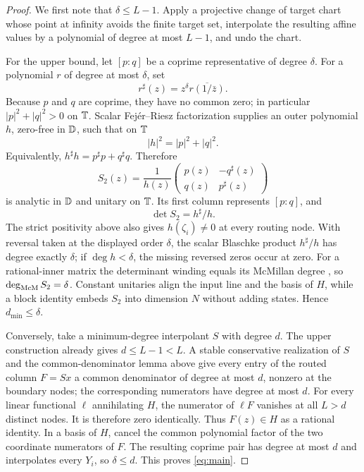 \documentclass[11pt]{article}
\theoremstyle{definition}\newtheorem{definition}[theorem]{Definition}\newtheorem{example}[theorem]{Example}
\theoremstyle{remark}\newtheorem{remark}[theorem]{Remark}\newtheorem{limitation}[theorem]{Limitation}
\begin{document}
\begin{proof}
We first note that $\delta\le L-1$.  Apply a projective change of target chart
whose point at infinity avoids the finite target set, interpolate the resulting
affine values by a polynomial of degree at most $L-1$, and undo the chart.

For the upper bound, let $[p:q]$ be a coprime representative of degree
$\delta$.  For a polynomial $r$ of degree at most $\delta$, set
\[
                   r^\sharp(z)=z^\delta\overline{r(1/\bar z)}.
\]
Because $p$ and $q$ are coprime, they have no common zero; in particular
$|p|^2+|q|^2>0$ on $\mathbb T$.  Scalar Fej\'er--Riesz factorization
\cite{DritschelRovnyak2010} supplies an outer polynomial $h$, zero-free
in $\mathbb D$, such that on $\mathbb T$
\[
                       |h|^2=|p|^2+|q|^2.
\]
Equivalently, $h^\sharp h=p^\sharp p+q^\sharp q$.  Therefore
\begin{equation}\label{eq:completion}
 S_2(z)=\frac1{h(z)}
 \begin{pmatrix}p(z)&-q^\sharp(z)\\q(z)&p^\sharp(z)\end{pmatrix}
\end{equation}
is analytic in $\mathbb D$ and unitary on $\mathbb T$.  Its first column represents $[p:q]$,
and
\[
                   \det S_2=h^\sharp/h.
\]
The strict positivity above also gives $h(\zeta_i)\ne0$ at every routing node.
With reversal taken at the displayed order $\delta$, the scalar Blaschke
product $h^\sharp/h$ has degree exactly $\delta$; if $\deg h<\delta$, the
missing reversed zeros occur at zero.
For a rational-inner matrix the determinant winding equals its McMillan degree
\cite{Potapov1955}, so $\deg_{\mathrm{McM}} S_2=\delta$.  Constant unitaries align the input
line and the basis of $H$, while a block identity embeds $S_2$ into dimension
$N$ without adding states.  Hence $d_{\min}\le\delta$.

Conversely, take a minimum-degree interpolant $S$ with degree $d$.  The upper
construction already gives $d\le L-1<L$.  A stable conservative realization of
$S$ and the common-denominator lemma above give every entry of the routed column
$F=Sx$ a common denominator of degree at most $d$, nonzero at the boundary
nodes; the corresponding numerators have degree at most $d$.  For every linear functional
$\ell$ annihilating $H$, the numerator of $\ell F$ vanishes at all $L>d$
distinct nodes.  It is therefore zero identically.  Thus $F(z)\in H$ as a
rational identity.  In a basis of $H$, cancel the common polynomial factor of
the two coordinate numerators of $F$.  The resulting coprime pair has degree at
most $d$ and interpolates every $Y_i$, so $\delta\le d$.  This proves
\eqref{eq:main}.
\end{proof}
\end{document}
